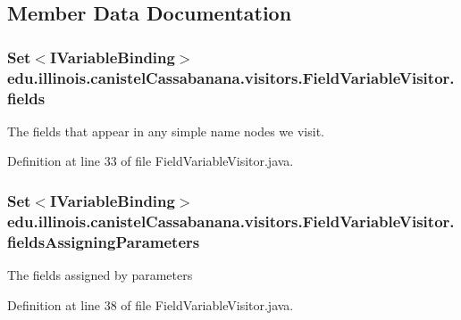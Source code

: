\subsection{Member Data Documentation}
\hypertarget{classedu_1_1illinois_1_1canistelCassabanana_1_1visitors_1_1FieldVariableVisitor_acaed6c0711716585d83b8b742b21ff15}{
\subsubsection[{fields}]{\setlength{\rightskip}{0pt plus 5cm}Set$<$IVariableBinding$>$ {\bf edu.illinois.canistelCassabanana.visitors.FieldVariableVisitor.fields}}}
\label{classedu_1_1illinois_1_1canistelCassabanana_1_1visitors_1_1FieldVariableVisitor_acaed6c0711716585d83b8b742b21ff15}
The fields that appear in any simple name nodes we visit. 

Definition at line 33 of file FieldVariableVisitor.java.

\hypertarget{classedu_1_1illinois_1_1canistelCassabanana_1_1visitors_1_1FieldVariableVisitor_a016a1649af7ec44dd7a5464ea7b567b7}{
\subsubsection[{fieldsAssigningParameters}]{\setlength{\rightskip}{0pt plus 5cm}Set$<$IVariableBinding$>$ {\bf edu.illinois.canistelCassabanana.visitors.FieldVariableVisitor.fieldsAssigningParameters}}}
\label{classedu_1_1illinois_1_1canistelCassabanana_1_1visitors_1_1FieldVariableVisitor_a016a1649af7ec44dd7a5464ea7b567b7}
The fields assigned by parameters 

Definition at line 38 of file FieldVariableVisitor.java.

